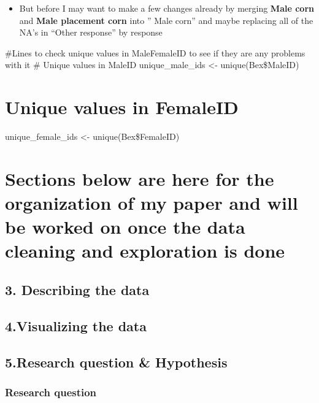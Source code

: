 \documentclass[
]{article}
\providecommand{\tightlist}{%
  \setlength{\itemsep}{0pt}\setlength{\parskip}{0pt}}
\begin{document}
\begin{itemize}
\tightlist
\item
  But before I may want to make a few changes already by merging
  \textbf{Male corn} and \textbf{Male placement corn} into '' Male
  corn'' and maybe replacing all of the NA's in ``Other response'' by
  response
\end{itemize}

\#Lines to check unique values in MaleFemaleID to see if they are any
problems with it \# Unique values in MaleID unique\_male\_ids \textless-
unique(Bex\$MaleID)

\hypertarget{unique-values-in-femaleid}{%
\section{Unique values in FemaleID}\label{unique-values-in-femaleid}}

unique\_female\_ids \textless- unique(Bex\$FemaleID)

\hypertarget{sections-below-are-here-for-the-organization-of-my-paper-and-will-be-worked-on-once-the-data-cleaning-and-exploration-is-done}{%
\section{Sections below are here for the organization of my paper and
will be worked on once the data cleaning and exploration is
done}\label{sections-below-are-here-for-the-organization-of-my-paper-and-will-be-worked-on-once-the-data-cleaning-and-exploration-is-done}}

\hypertarget{describing-the-data}{%
\subsection{3. Describing the data}\label{describing-the-data}}

\hypertarget{visualizing-the-data}{%
\subsection{4.Visualizing the data}\label{visualizing-the-data}}

\hypertarget{research-question-hypothesis}{%
\subsection{5.Research question \&
Hypothesis}\label{research-question-hypothesis}}

\hypertarget{research-question}{%
\subsubsection{Research question}\label{research-question}}
\end{document}
